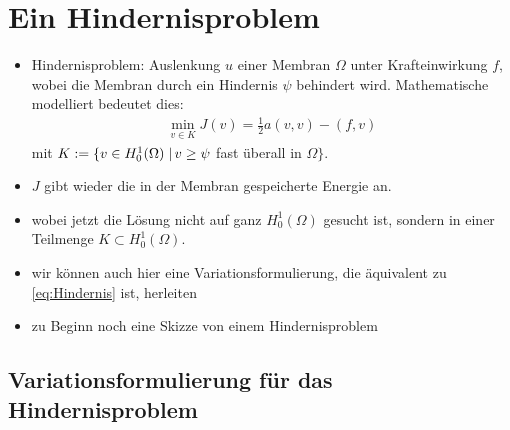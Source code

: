 
\section{Ein Hindernisproblem}

\begin{itemize}
\item Hindernisproblem: Auslenkung $u$ einer Membran $\Omega$ unter Krafteinwirkung $f$, wobei die Membran durch ein Hindernis $\psi$ behindert wird. Mathematische modelliert bedeutet dies:
\begin{align}\label{eq:Hindernis}
\min_{v\in K} J(v) = \frac 1 2 a(v,v)-(f,v)
\end{align}
mit $K := \{v \in H^1_0(\Omega) \;\vert\, v\ge \psi$ fast überall in $\Omega\}$. 

\item $J$ gibt wieder die in der Membran gespeicherte Energie an.
\item wobei jetzt die Lösung nicht auf ganz $H^1_0(\Omega)$ gesucht ist, sondern in einer Teilmenge $K \subset H^1_0(\Omega)$.

\item wir können auch hier eine Variationsformulierung, die äquivalent zu \eqref{eq:Hindernis} ist, herleiten

\item zu Beginn noch eine Skizze von einem Hindernisproblem

\end{itemize}


\subsection{Variationsformulierung für das Hindernisproblem}

